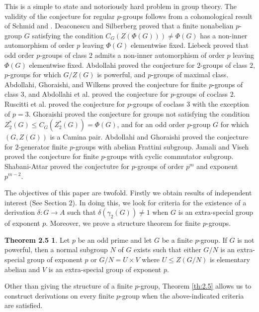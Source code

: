 \documentclass[preprint,sort&compress,12pt]{elsarticle}
\theoremstyle{definition}
\newtheorem*{th25}{Theorem 2.5}
\numberwithin{equation}{theorem}
\begin{document}
This is a simple to state and notoriously hard problem in group theory. The validity of the conjecture for regular $p$-groups follows from a cohomological result of Schmid \cite{PS80} and \cite{DS}. Deaconescu and Silberberg \cite{DS} proved that a finite nonabelian $p$-group $G$ satisfying the condition $C_G(Z(\Phi(G)))\neq \Phi(G)$ has a non-inner automorphism of order $p$ leaving $\Phi(G)$ elementwise fixed. Liebeck \cite{LH} proved that odd order $p$-groups of class $2$ admits a non-inner automorphism of order $p$ leaving $\Phi(G)$ elementwise fixed. Abdollahi \cite{A07,A10} proved the conjecture for $2$-groups of class $2$, $p$-groups for which $G/Z(G)$ is powerful, and $p$-groups of maximal class. Abdollahi, Ghoraishi, and Wilkens \cite{AGW13} proved the conjecture for finite $p$-groups of class $3$, and Abdollahi et al. \cite{AGMG14} proved the conjecture for $p$-groups of coclass $2$. Ruscitti et al. \cite{MLM} proved the conjecture for $p$-groups of coclass $3$ with the exception of $p=3$. Ghoraishi \cite{SG14, SG13} proved the conjecture for groups not satisfying the condition $Z_2^*(G)\le C_G(Z_2^*(G))=\Phi(G)$, and for an odd order $p$-group $G$ for which $(G, Z(G))$ is a Camina pair. Abdollahi and Ghoraishi \cite{AG17} proved the conjecture for $2$-generator finite $p$-groups with abelian Frattini subgroup. Jamali and Viseh \cite{JV13} proved the conjecture for finite $p$-groups with cyclic commutator subgroup. Shabani-Attar \cite{S13} proved the conjectutre for $p$-groups of order $p^m$ and exponent $p^{m-2}$. 

The objectives of this paper are twofold. Firstly we obtain results of independent interest (See Section $2$). In doing this, we look for criteria for the existence of a derivation $\delta: G\rightarrow A$ such that $\delta(\gamma_2(G))\neq 1$ when $G$ is an extra-special group of exponent $p$. Moreover, we prove a structure theorem for finite $p$-groups. 

\begin{th25}
Let $p$ be an odd prime and let $G$ be a finite $p$-group. If $G$ is not powerful, then a normal subgroup $N$ of $G$ exists such that either $G/N$ is an extra-special group of exponent $p$ or $G/N=U\times V$ where $U\le Z(G/N)$ is elementary abelian and $V$ is an extra-special group of exponent $p$.
\end{th25}

Other than giving the structure of a finite $p$-group, Theorem \ref{th:2.5} allows us to construct derivations on every finite $p$-group when the above-indicated criteria are satisfied.
\end{document}
